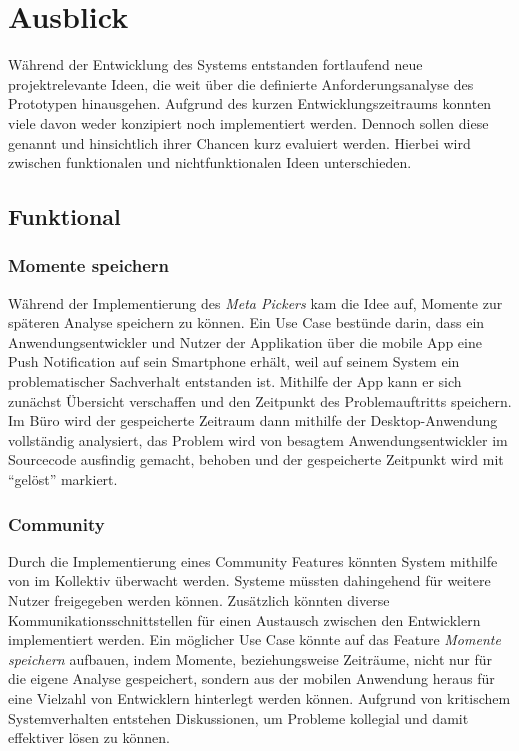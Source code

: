 \section{Ausblick}

Während der Entwicklung des Systems entstanden fortlaufend neue projektrelevante Ideen,
die weit über die definierte Anforderungsanalyse des Prototypen hinausgehen.
Aufgrund des kurzen Entwicklungszeitraums konnten viele davon weder konzipiert noch implementiert werden.
Dennoch sollen diese genannt und hinsichtlich ihrer Chancen kurz evaluiert werden.
Hierbei wird zwischen funktionalen und nichtfunktionalen Ideen unterschieden.

\subsection{Funktional}

\subsubsection{Momente speichern}

Während der Implementierung des \emph{Meta Pickers} kam die Idee auf, Momente zur späteren Analyse speichern zu können.
Ein Use Case bestünde darin, dass ein Anwendungsentwickler und Nutzer der Applikation \projectname{}
über die mobile App eine Push Notification auf sein Smartphone erhält, weil auf seinem System ein problematischer Sachverhalt
entstanden ist. Mithilfe der App kann er sich zunächst Übersicht verschaffen und den Zeitpunkt des Problemauftritts speichern.
Im Büro wird der gespeicherte Zeitraum dann mithilfe der Desktop-Anwendung vollständig analysiert,
das Problem wird von besagtem Anwendungsentwickler im Sourcecode ausfindig gemacht, behoben und der gespeicherte Zeitpunkt wird mit ``gelöst'' markiert.

\subsubsection{Community}

Durch die Implementierung eines Community Features könnten System mithilfe von \projectname{} im Kollektiv überwacht werden.
Systeme müssten dahingehend für weitere Nutzer freigegeben werden können.
Zusätzlich könnten diverse Kommunikationsschnittstellen für einen
Austausch zwischen den Entwicklern implementiert werden. Ein möglicher Use Case könnte auf das Feature
\emph{Momente speichern} aufbauen,
indem Momente, beziehungsweise Zeiträume, nicht nur für die eigene Analyse gespeichert, sondern aus der mobilen Anwendung heraus
für eine Vielzahl von Entwicklern hinterlegt werden können.
Aufgrund von kritischem Systemverhalten entstehen Diskussionen, um Probleme kollegial und damit effektiver lösen zu können.

